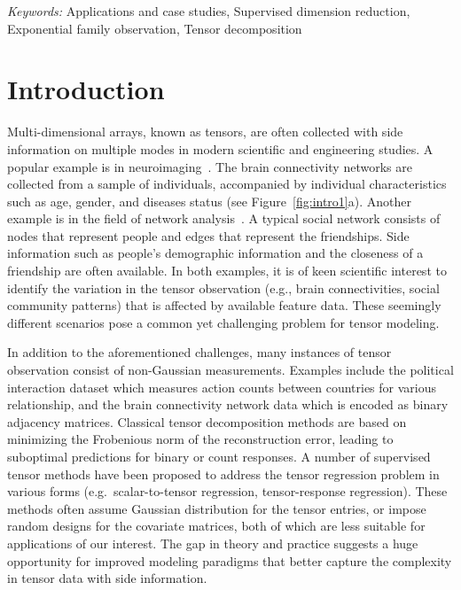 \documentclass[12pt]{article}
\theoremstyle{plain}
\theoremstyle{definition}
\begin{document}
\noindent%
{\it Keywords:} Applications and case studies, Supervised dimension reduction, Exponential family observation, Tensor decomposition
\vfill

\newpage
{} %
\section{Introduction}
\label{sec:intro}


Multi-dimensional arrays, known as tensors, are often collected with side information on multiple modes in modern scientific and engineering studies. A popular example is in neuroimaging~\citep{sun2017store,zhou2013tensor}. The brain connectivity networks are collected from a sample of individuals, accompanied by individual characteristics such as age, gender, and diseases status (see Figure~\ref{fig:intro1}a). Another example is in the field of network analysis~\citep{baldin2018optimal,hoff2005bilinear}. A typical social network consists of nodes that represent people and edges that represent the friendships. Side information such as people’s demographic information and the closeness of a friendship are often available. In both examples, it is of keen scientific interest to identify the variation in the tensor observation (e.g., brain connectivities, social community patterns) that is affected by available feature data. These seemingly different scenarios pose a common yet challenging problem for tensor modeling. 

In addition to the aforementioned challenges, many instances of tensor observation consist of non-Gaussian measurements. Examples include the political interaction dataset \citep{hu2015scalable} which measures action counts between countries for various relationship, and the brain connectivity network data \citep{wang2019common} which is encoded as binary adjacency matrices. Classical tensor decomposition methods are based on minimizing the Frobenious norm of the reconstruction error, leading to suboptimal predictions for binary or count responses. A number of supervised tensor methods have been proposed \citep{yu2016learning, raskutti2015convex, zhao2012higher} to address the tensor regression problem in various forms (e.g.\ scalar-to-tensor regression, tensor-response regression). These methods often assume Gaussian distribution for the tensor entries, or impose random designs for the covariate matrices, both of which are less suitable for applications of our interest. The gap in theory and practice suggests a huge opportunity for improved modeling paradigms that better capture the complexity in tensor data with side information.
\end{document}
